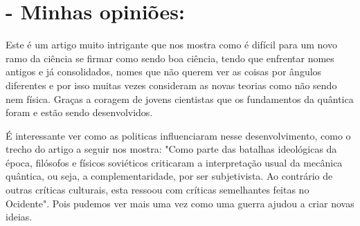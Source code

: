 \documentclass [a4paper, 12pt]{article}
\begin{document}
\section*{- Minhas opiniões:}

Este é um artigo muito intrigante que nos mostra como é difícil para um novo ramo da ciência se firmar como sendo boa ciência, tendo que enfrentar nomes antigos e já consolidados, nomes que não querem ver as coisas por ângulos diferentes e por isso muitas vezes consideram as novas teorias como não sendo nem física. Graças a coragem de jovens cientistas que os fundamentos da quântica foram e estão sendo desenvolvidos.

É interessante ver como as politicas influenciaram nesse desenvolvimento, como o trecho do artigo a seguir nos mostra: "Como parte das batalhas ideológicas da época, filósofos e físicos soviéticos criticaram a interpretação usual da mecânica quântica, ou seja, a complementaridade, por ser subjetivista. Ao contrário de outras críticas culturais, esta ressoou com críticas semelhantes feitas no Ocidente". Pois pudemos ver mais uma vez como uma guerra ajudou a criar novas ideias. 
\end{document}
